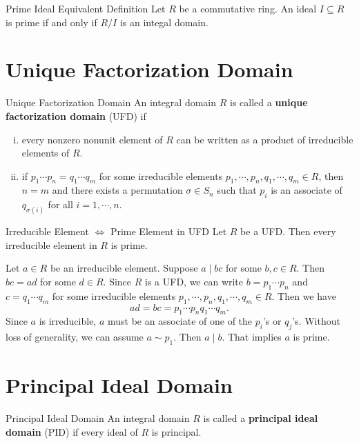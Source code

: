 \begin{proposition}{Prime Ideal Equivalent Definition}{}
    Let $R$ be a commutative ring. An ideal $I\subseteq R$ is prime if and only if $R/I$ is an integal domain.
\end{proposition}


\section{Unique Factorization Domain}
\begin{definition}{Unique Factorization Domain}{}
    An integral domain $R$ is called a \textbf{unique factorization domain} (UFD) if
    \begin{enumerate}[(i)]
        \item every nonzero nonunit element of $R$ can be written as a product of irreducible elements of $R$.
        \item if $p_1\cdots p_n=q_1\cdots q_m$ for some irreducible elements $p_1,\cdots,p_n,q_1,\cdots,q_m\in R$, then $n=m$ and there exists a permutation $\sigma\in S_n$ such that $p_i$ is an associate of $q_{\sigma(i)}$ for all $i=1,\cdots,n$.
    \end{enumerate}
\end{definition}

\begin{proposition}{Irreducible Element $\iff$ Prime Element in UFD}{}
    Let $R$ be a UFD. Then every irreducible element in $R$ is prime.
\end{proposition}

\begin{prf}
    Let $a\in R$ be an irreducible element. Suppose $a\mid bc$ for some $b,c\in R$. Then $bc=ad$ for some $d\in R$. Since $R$ is a UFD, we can write $b=p_1\cdots p_n$ and $c=q_1\cdots q_m$ for some irreducible elements $p_1,\cdots,p_n,q_1,\cdots,q_m\in R$. Then we have $$ad=bc=p_1\cdots p_nq_1\cdots q_m.$$ Since $a$ is irreducible, $a$ must be an associate of one of the $p_i$'s or $q_j$'s. Without loss of generality, we can assume $a\sim p_1$. Then $a\mid b$. That implies $a$ is prime.
\end{prf}


\section{Principal Ideal Domain}
\begin{definition}{Principal Ideal Domain}{}
    An integral domain $R$ is called a \textbf{principal ideal domain} (PID) if every ideal of $R$ is principal.
\end{definition}

